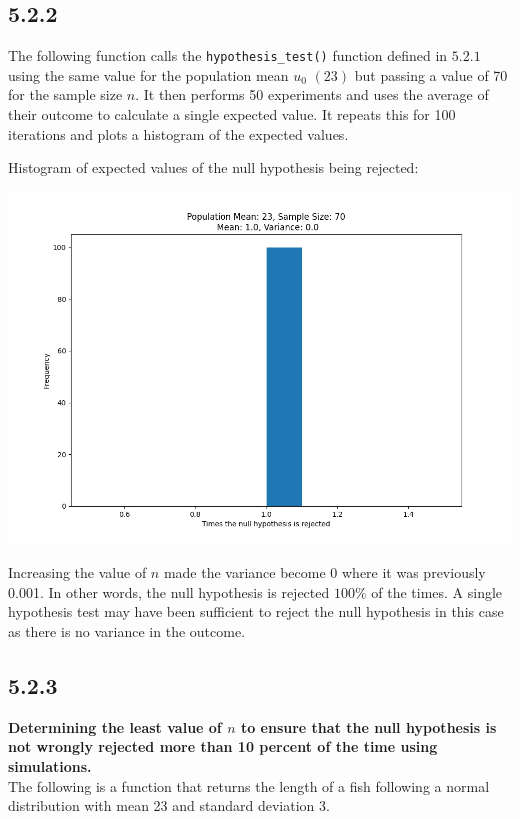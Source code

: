 \documentclass[answers]{exam}
\begin{document}
\subsection*{5.2.2}
The following function calls the \texttt{hypothesis\_test()} function defined in $5.2.1$ using the same value for the population mean $u_0$ $(23)$ but passing a value of 70 for the sample size $n$. It then performs 50 experiments and uses the average of their outcome to calculate a single expected value. It repeats this for 100 iterations and plots a histogram of the expected values.

Histogram of expected values of the null hypothesis being rejected:
\begin{center}
  \includegraphics[scale = 0.5]{Q5/Q5.2.2.png}
\end{center}
Increasing the value of $n$ made the variance become $0$ where it was previously 0.001. In other words, the null hypothesis is rejected $100\%$ of the times. A single hypothesis test may have been sufficient to reject the null hypothesis in this case as there is no variance in the outcome.

\subsection*{5.2.3}
\textbf{Determining the least value of $n$ to ensure that the null hypothesis is not wrongly rejected more than 10 percent of the time using simulations.}\\ 

The following is a function that returns the length of a fish following a normal distribution with mean 23 and standard deviation 3.

\end{document}
